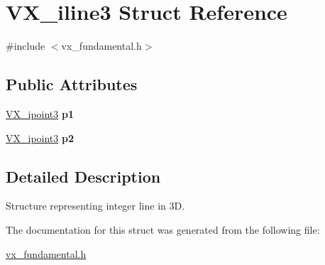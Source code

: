 \hypertarget{structVX__iline3}{\section{V\-X\-\_\-iline3 Struct Reference}
\label{structVX__iline3}
}


{\ttfamily \#include $<$vx\-\_\-fundamental.\-h$>$}

\subsection*{Public Attributes}
\begin{DoxyCompactItemize}
\item 
\hypertarget{structVX__iline3_a2f67b74a983605cbdb2e07824816509c}{\hyperlink{structVX__ipoint3}{V\-X\-\_\-ipoint3} {\bfseries p1}}\label{structVX__iline3_a2f67b74a983605cbdb2e07824816509c}

\item 
\hypertarget{structVX__iline3_a6e3f7bde5ffc3eeff0f9281c3ccdf6ae}{\hyperlink{structVX__ipoint3}{V\-X\-\_\-ipoint3} {\bfseries p2}}\label{structVX__iline3_a6e3f7bde5ffc3eeff0f9281c3ccdf6ae}

\end{DoxyCompactItemize}


\subsection{Detailed Description}
Structure representing integer line in 3\-D. 

The documentation for this struct was generated from the following file\-:\begin{DoxyCompactItemize}
\item 
\hyperlink{vx__fundamental_8h}{vx\-\_\-fundamental.\-h}\end{DoxyCompactItemize}
